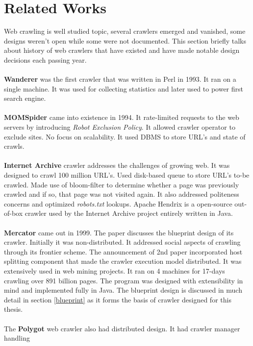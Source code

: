 \section{Related Works}\label{relatedworks}
Web crawling is well studied topic, several crawlers emerged and vanished, some designs weren't open while
some were not documented. This section briefly talks about history of web crawlers that have existed and have made notable design decisions each passing year.
\\
\\
\textbf{Wanderer} was the first crawler that was written in Perl in 1993. It ran on a single machine. It was used for collecting statistics and later used to power first search engine. 
\\
\\
\textbf{MOMSpider} came into existence in 1994. It rate-limited requests to the web servers by introducing
\textit{Robot Exclusion Policy}. It allowed crawler operator to exclude sites. No focus on scalability. It
used DBMS to store URL's and state of crawls.
\\
\\
\textbf{Internet Archive} \cite{netarchive} crawler addresses the challenges of growing web. It was designed to crawl 100 million URL's. Used disk-based queue to store URL's to-be crawled. Made use of bloom-filter to determine whether a page was previously crawled and if so, that page was not visited again. It also addressed politeness concerns and optimized \textit{robots.txt} lookups. Apache Hendrix is a open-source out-of-box
crawler used by the Internet Archive project entirely written in Java.
\\
\\
\textbf{Mercator} \cite{mercator} came out in 1999. The paper discusses the blueprint design of its crawler. Initially it was non-distributed. It addressed social aspects of crawling through its frontier scheme. The announcement of 2nd paper incorporated host splitting component that made the crawler execution model distributed. It was extensively used in web mining projects. It ran on 4 machines for 17-days crawling over 891 billion pages. The program was designed with extensibility in mind and implemented fully in Java.
The blueprint design is discussed in much detail in section \ref{blueprint} as it forms the basis of
crawler designed for this thesis.
\\
\\
The \textbf{Polygot} web crawler also had distributed design. It had crawler manager handling
